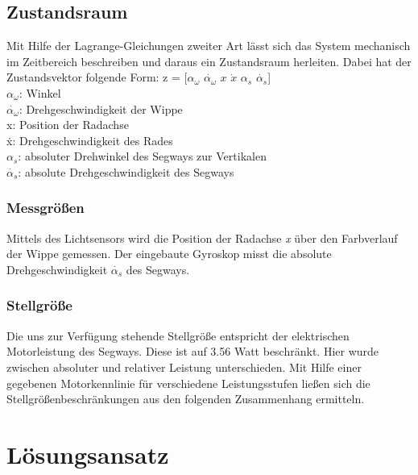 \documentclass[pdf]{ifacconf}
\begin{document}
	\subsection{Zustandsraum}
	Mit Hilfe der Lagrange-Gleichungen zweiter Art lässt sich das System mechanisch 		im Zeitbereich beschreiben und daraus ein Zustandsraum herleiten.
	Dabei hat der Zustandsvektor folgende Form:
	z = [$\alpha^{}_{\omega}$ $\dot{\alpha^{}_{\omega}}$ $x$ $\dot{x}$ $\alpha^{}_{s}$ $\dot{\alpha^{}_{s}}$] \\
	$\alpha^{}_{\omega}$: Winkel\\
	$\dot{\alpha^{}_{\omega}}$: Drehgeschwindigkeit der Wippe\\
	x:  Position der Radachse\\
	\.{x}:  Drehgeschwindigkeit des Rades\\
	$\alpha^{}_{s}$: absoluter Drehwinkel des Segways zur Vertikalen\\
	$\dot{\alpha^{}_{s}}$: absolute Drehgeschwindigkeit des Segways\\
	
		\subsubsection{Messgrößen}
		Mittels des Lichtsensors wird die Position der Radachse \textit{x} über den 		Farbverlauf der Wippe gemessen. Der eingebaute Gyroskop misst die absolute Drehgeschwindigkeit $\dot{\alpha^{}_{s}}$ des Segways.
		
		\subsubsection{Stellgröße}
		Die uns zur Verfügung stehende Stellgröße entspricht der elektrischen Motorleistung des Segways. Diese ist auf 3.56 Watt beschränkt.
		Hier wurde zwischen absoluter und relativer Leistung unterschieden. Mit Hilfe einer gegebenen Motorkennlinie für verschiedene Leistungsstufen ließen sich die Stellgrößenbeschränkungen aus den folgenden Zusammenhang ermitteln.

	
\section{Lösungsansatz}
\end{document}

